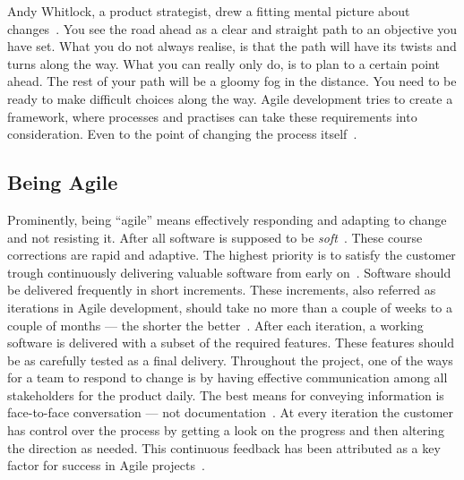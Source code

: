 \documentclass[english]{tktltiki2}
\begin{document}
Andy Whitlock, a product strategist, drew a fitting mental picture about changes~\cite{Whi14}. You see the road ahead as a clear and straight path to an objective you have set. What you do not always realise, is that the path will have its twists and turns along the way. What you can really only do, is to plan to a certain point ahead. The rest of your path will be a gloomy fog in the distance. You need to be ready to make difficult choices along the way. Agile development tries to create a framework, where processes and practises can take these requirements into consideration. Even to the point of changing the process itself~\cite{Fow05}.

\subsection{Being Agile}

Prominently, being “agile” means effectively responding and adapting to change and not resisting it. After all software is supposed to be \emph{soft}~\cite{Fow05}. These course corrections are rapid and adaptive. The highest priority is to satisfy the customer trough continuously delivering valuable software from early on~\cite{BBB01b}. Software should be delivered frequently in short increments. These increments, also referred as iterations in Agile development, should take no more than a couple of weeks to a couple of months — the shorter the better~\cite{Fow05}. After each iteration, a working software is delivered with a subset of the required features. These features should be as carefully tested as a final delivery. Throughout the project, one of the ways for a team to respond to change is by having effective communication among all stakeholders for the product daily. The best means for conveying information is face-to-face conversation — not documentation~\cite{BBB01b}. At every iteration the customer has control over the process by getting a look on the progress and then altering the direction as needed. This continuous feedback has been attributed as a key factor for success in Agile projects~\cite{DD08}.
\end{document}
